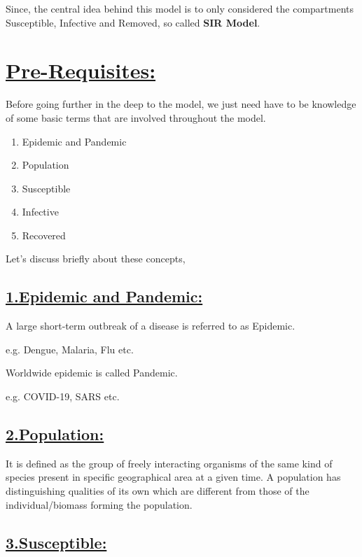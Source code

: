 \documentclass[12pt,a4paper]{article}
\begin{document}
    Since, the central idea behind this model is to only considered the compartments Susceptible, Infective and Removed, so called {\bf SIR Model}.

    \section*{\underline{Pre-Requisites:}}
    Before going further in the deep to the model, we just need have to be knowledge of some basic terms that are involved throughout the model.

    \begin{enumerate}
        \item Epidemic and Pandemic
        \item Population
        \item Susceptible
        \item Infective
        \item Recovered
    \end{enumerate}

    Let's discuss briefly about these concepts,

    \subsection*{\underline{1.Epidemic and Pandemic:}}

    A large short-term outbreak of a disease is referred to as Epidemic.
    
    e.g. Dengue, Malaria, Flu etc.
    \vspace*{1cm}

    Worldwide epidemic is called Pandemic.
    
    e.g. COVID-19, SARS etc.

    \pagebreak

    \subsection*{\underline{2.Population:}}

    It is defined as the group of freely interacting organisms of the same kind of species present in specific geographical area at a given time. A population has distinguishing qualities of its own which are different from those of the individual/biomass forming the population.

    \subsection*{\underline{3.Susceptible:}}
\end{document}
